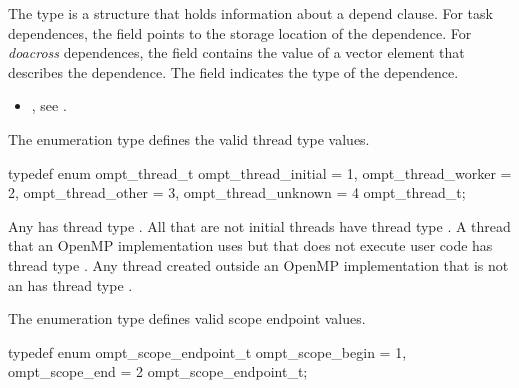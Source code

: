 \descr
The  type is a structure that holds information about 
a depend clause. For task dependences, the  field points to the 
storage location of the dependence. For \emph{doacross} dependences, the 
 field contains the value of a vector element that describes
the dependence. The  field indicates the type of the dependence.

\crossreferences
\begin{itemize}
\item {}, see
.
\end{itemize}



\label{sec:ompt_thread_t}

\summary
The  enumeration type defines the valid thread type values.

\format
\begin{ccppspecific}
\begin{omptEnum}
typedef enum ompt_thread_t {
  ompt_thread_initial                 = 1,
  ompt_thread_worker                  = 2,
  ompt_thread_other                   = 3,
  ompt_thread_unknown                 = 4
} ompt_thread_t;
\end{omptEnum}
\end{ccppspecific}

\descr
Any  has thread type .
All  that are not initial threads have thread
type . A thread that an OpenMP implementation 
uses but that does not execute user code has thread type .  
Any thread created outside an OpenMP implementation that is not an 
 has thread type .



\label{sec:ompt_scope_endpoint_t}

\summary
The  enumeration type defines valid scope endpoint values.

\format
\begin{ccppspecific}
\begin{omptEnum}
typedef enum ompt_scope_endpoint_t {
  ompt_scope_begin                    = 1,
  ompt_scope_end                      = 2
} ompt_scope_endpoint_t;
\end{omptEnum}
\end{ccppspecific}



